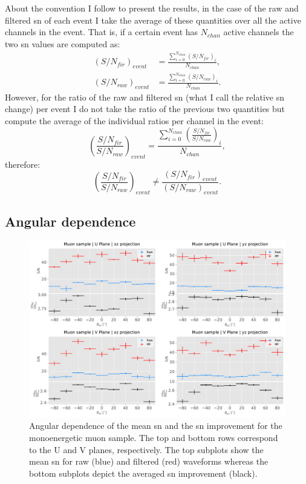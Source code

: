 About the convention I follow to present the results, in the case of the raw and filtered \gls{sn} of each event I take the average of these quantities over all the active channels in the event. That is, if a certain event has $N_{chan}$ active channels the two \gls{sn} values are computed as:
\begin{equation}
\begin{split}
\left(S/N_{fir}\right)_{event} &= \frac{\sum_{i=0}^{N_{chan}} \left(S/N_{fir}\right)_{i}}{N_{chan}},\\
\left(S/N_{raw}\right)_{event} &= \frac{\sum_{i=0}^{N_{chan}} \left(S/N_{raw}\right)_{i}}{N_{chan}}.
\end{split}
\end{equation}
However, for the ratio of the raw and filtered \gls{sn} (what I call the relative \gls{sn} change) per event I do not take the ratio of the previous two quantities but compute the average of the individual ratios per channel in the event:
\begin{equation}
\left(\frac{S/N_{fir}}{S/N_{raw}}\right)_{event} = \frac{\sum_{i=0}^{N_{chan}} \left(\frac{S/N_{fir}}{S/N_{raw}}\right)_{i}}{N_{chan}},
\end{equation}
therefore:
\begin{equation}
\left(\frac{S/N_{fir}}{S/N_{raw}}\right)_{event}  \neq \frac{\left(S/N_{fir}\right)_{event}}{\left(S/N_{raw}\right)_{event}}.
\end{equation}

\subsection{Angular dependence}
\label{subsec:2.5.1}

\begin{figure}[t]
	\centering
	\includegraphics[width=0.9\linewidth]{Images/Matched_Filter/larsoft_muon_angular_alt.pdf}
	\caption[Angular dependence of the mean \gls{sn} and the \gls{sn} improvement for the monoenergetic muon sample.]{Angular dependence of the mean \gls{sn} and the \gls{sn} improvement for the monoenergetic muon sample. The top and bottom rows correspond to the U and V planes, respectively. The top subplots show the mean \gls{sn} for raw (blue) and filtered (red) waveforms whereas the bottom subplots depict the averaged \gls{sn} improvement (black).}
	\label{fig:angular_muon}
\end{figure}

